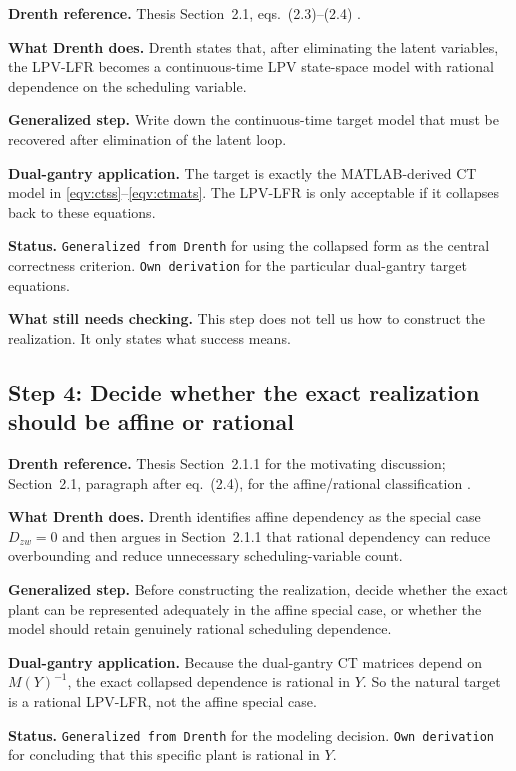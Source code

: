 ﻿\documentclass[11pt]{article}
\newcommand{\audititem}[2]{\par\smallskip\noindent\textbf{#1.} #2\par}
\newcommand{\statusline}[1]{\texttt{#1}}
\begin{document}
\audititem{Drenth reference}{Thesis Section~2.1, eqs.~(2.3)--(2.4)
\cite{drenth2025thesis}.}

\audititem{What Drenth does}{Drenth states that, after eliminating the latent
variables, the LPV-LFR becomes a continuous-time LPV state-space model with
rational dependence on the scheduling variable.}

\audititem{Generalized step}{Write down the continuous-time target model that
must be recovered after elimination of the latent loop.}

\audititem{Dual-gantry application}{The target is exactly the MATLAB-derived CT
model in \eqref{eqv:ctss}--\eqref{eqv:ctmats}. The LPV-LFR is only acceptable if
it collapses back to these equations.}

\audititem{Status}{\statusline{Generalized from Drenth} for using the collapsed
form as the central correctness criterion. \statusline{Own derivation} for the
particular dual-gantry target equations.}

\audititem{What still needs checking}{This step does not tell us how to
construct the realization. It only states what success means.}

\subsection{Step 4: Decide whether the exact realization should be affine or rational}

\audititem{Drenth reference}{Thesis Section~2.1.1 for the motivating discussion;
Section~2.1, paragraph after eq.~(2.4), for the affine/rational classification
\cite{drenth2025thesis}.}

\audititem{What Drenth does}{Drenth identifies affine dependency as the special
case $D_{zw}=0$ and then argues in Section~2.1.1 that rational dependency can
reduce overbounding and reduce unnecessary scheduling-variable count.}

\audititem{Generalized step}{Before constructing the realization, decide whether
the exact plant can be represented adequately in the affine special case, or
whether the model should retain genuinely rational scheduling dependence.}

\audititem{Dual-gantry application}{Because the dual-gantry CT matrices depend
on $M(Y)^{-1}$, the exact collapsed dependence is rational in $Y$. So the
natural target is a rational LPV-LFR, not the affine special case.}

\audititem{Status}{\statusline{Generalized from Drenth} for the modeling
decision. \statusline{Own derivation} for concluding that this specific plant is
rational in $Y$.}
\end{document}
